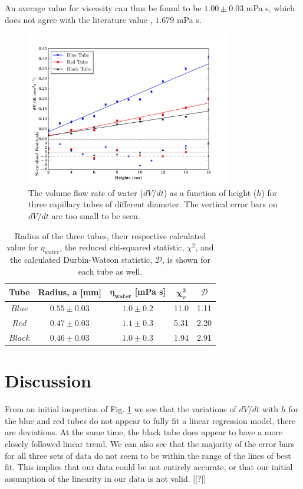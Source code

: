 \documentclass[twocolumn]{revtex4}
\begin{document}
An average value for viscosity can thus be found to be $1.00 \pm 0.03$ mPa s, which does not agree with the literature value \cite{crc}, $1.679$  mPa {s}. 

\vspace{-1ex}
\begin{figure}[!h]
\begin{center}
\includegraphics[width=9cm]{fig1-2}
\caption[]{The volume flow rate of water ($dV/dt$) as a function of height ($h$) for three capillary tubes of different diameter. The vertical error bars on $dV/dt$ are too small to be seen.}
\label{fig:fig2}
\end{center}
\end{figure}

\begin{table}[h!]
\centering
\begin{tabular}{ |c|c|c|c|c| } 
 \hline
 \textbf{Tube} & \textbf{Radius, a [mm]} & \textbf{$\boldsymbol{\eta_{water}}$ [mPa {s}]} & \textbf{$\boldsymbol{\chi^2_{\nu}}$} & $\mathcal{D}$\\ [0.5ex] 
 \hline\hline
 $Blue$ &$0.55\pm0.03$ & $1.0\pm0.2$ & 11.0 & 1.11\\ 
 $Red$ & $0.47\pm0.03$ & $1.1\pm0.3$ & 5.31 & 2.20\\
 $Black$ & $0.46\pm0.03$ & $1.0\pm0.3$ & 1.94 & 2.91\\
 
 \hline
\end{tabular}
\caption{Radius of the three tubes, their respective calculated value for $\eta_{water}$, the reduced chi-squared statistic, $\chi^2$, and the calculated Durbin-Watson statistic, $\mathcal{D}$, is shown for each tube as well.}
\label{table:1}
\end{table}


\vspace{-3ex}
\section{Discussion}
\vspace{-2ex}
From an initial inspection of Fig. \ref{fig:fig2} we see that the variations of $dV/dt$ with $h$ for the blue and red tubes do not appear to fully fit a linear regression model, there are deviations. At the same time, the black tube does appear to have a more closely followed linear trend. We can also see that the majority of the error bars for all three sets of data do not seem to be within the range of the lines of best fit. This implies that our data could be not entirely accurate, or that our initial assumption of the linearity in our data is not valid. [[?]]
\end{document}
